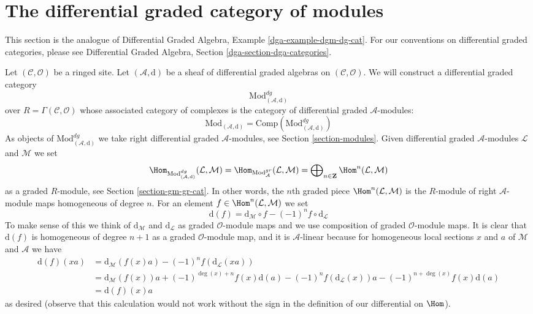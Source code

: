 \section{The differential graded category of modules}
\label{section-dgm-dg-cat}

\noindent
This section is the analogue of
Differential Graded Algebra, Example \ref{dga-example-dgm-dg-cat}.
For our conventions on differential graded categories, please
see Differential Graded Algebra, Section \ref{dga-section-dga-categories}.

\medskip\noindent
Let $(\mathcal{C}, \mathcal{O})$ be a ringed site.
Let $(\mathcal{A}, \text{d})$ be a sheaf of differential graded algebras
on $(\mathcal{C}, \mathcal{O})$. We will construct
a differential graded category
$$
\text{Mod}^{dg}_{(\mathcal{A}, \text{d})}
$$
over $R = \Gamma(\mathcal{C}, \mathcal{O})$ whose associated category
of complexes is the category of differential graded $\mathcal{A}$-modules:
$$
\text{Mod}_{(\mathcal{A}, \text{d})} =
\text{Comp}(\text{Mod}^{dg}_{(\mathcal{A}, \text{d})})
$$
As objects of $\text{Mod}^{dg}_{(\mathcal{A}, \text{d})}$ we take right
differential graded $\mathcal{A}$-modules, see
Section \ref{section-modules}. Given differential graded
$\mathcal{A}$-modules $\mathcal{L}$ and $\mathcal{M}$ we set
$$
\Hom_{\text{Mod}^{dg}_{(\mathcal{A}, \text{d})}}(\mathcal{L}, \mathcal{M}) =
\Hom_{\text{Mod}^{gr}_\mathcal{A}}(\mathcal{L}, \mathcal{M}) =
\bigoplus\nolimits_{n \in \mathbf{Z}} \Hom^n(\mathcal{L}, \mathcal{M})
$$
as a graded $R$-module, see Section \ref{section-gm-gr-cat}.
In other words, the $n$th graded piece
$\Hom^n(\mathcal{L}, \mathcal{M})$ is the $R$-module of right
$\mathcal{A}$-module maps homogeneous of degree $n$.
For an element $f \in \Hom^n(\mathcal{L}, \mathcal{M})$ we set
$$
\text{d}(f) =
\text{d}_\mathcal{M} \circ f - (-1)^n f \circ \text{d}_\mathcal{L}
$$
To make sense of this we think of $\text{d}_\mathcal{M}$ and
$\text{d}_\mathcal{L}$ as graded $\mathcal{O}$-module maps and
we use composition of graded $\mathcal{O}$-module maps.
It is clear that $\text{d}(f)$ is homogeneous of
degree $n + 1$ as a graded $\mathcal{O}$-module map, and it is
$\mathcal{A}$-linear because for homogeneous local sections $x$ and $a$
of $\mathcal{M}$ and $\mathcal{A}$ we have
\begin{align*}
\text{d}(f)(xa)
& =
\text{d}_\mathcal{M}(f(x) a) - (-1)^n f (\text{d}_\mathcal{L}(xa)) \\
& =
\text{d}_\mathcal{M}(f(x)) a + (-1)^{\deg(x) + n} f(x) \text{d}(a) 
- (-1)^n f(\text{d}_\mathcal{L}(x)) a - (-1)^{n + \deg(x)} f(x) \text{d}(a) \\
& = \text{d}(f)(x) a
\end{align*}
as desired (observe that this calculation would not work without the
sign in the definition of our differential on $\Hom$).

